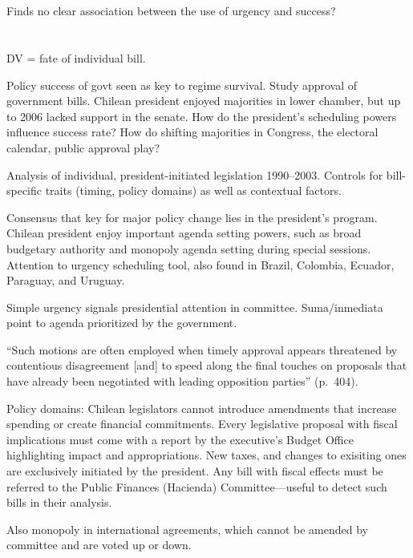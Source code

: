 \documentclass[letter,12pt]{article}
\begin{document}
\section{\citet{siavelis.1997}}

Finds no clear association between the use of urgency and success?

\section{\citet{aleman.navia.UrgChi.2009}}

DV = fate of individual bill. 

Policy success of govt seen as key to regime survival. Study approval of government bills. Chilean president enjoyed majorities in lower chamber, but up to 2006 lacked support in the senate. How do the president's scheduling powers influence success rate? How do shifting majorities in Congress, the electoral calendar, public approval play? 

Analysis of individual, president-initiated legislation 1990--2003. Controls for bill-specific traits (timing, policy domains) as well as contextual factors. 

Consensus that key for major policy change lies in the president's program. Chilean president enjoy important agenda setting powers, such as broad budgetary authority and monopoly agenda setting during special sessions. Attention to urgency scheduling tool, also found in Brazil, Colombia, Ecuador, Paraguay, and Uruguay. 

Simple urgency signals presidential attention in committee. Suma/inmediata point to agenda prioritized by the government. 

``Such motions are often employed when timely approval appears threatened by contentious disagreement [and] to speed along the final touches on proposals that have already been negotiated with leading opposition parties'' (p.\ 404). 

Policy domains: Chilean legislators cannot introduce amendments that increase spending or create financial commitments. Every legislative proposal with fiscal implications must come with a report by the executive's Budget Office highlighting impact and appropriations. New taxes, and changes to exisiting ones are exclusively initiated by the president. Any bill with fiscal effects must be referred to the Public Finances (Hacienda) Committee---useful to detect such bills in their analysis. 

Also monopoly in international agreements, which cannot be amended by committee and are voted up or down. 
\end{document}
